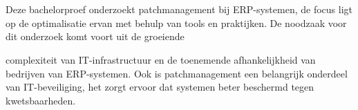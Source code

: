 
%
%
%
%
%

%



\chapter*{}


Deze bachelorproef onderzoekt patchmanagement bij ERP-systemen, de focus ligt op de optimalisatie ervan met behulp van tools en praktijken. De noodzaak voor dit onderzoek komt voort uit de groeiende 

complexiteit van IT-infrastructuur en de toenemende afhankelijkheid van bedrijven van ERP-systemen. Ook is patchmanagement een belangrijk onderdeel van IT-beveiliging, het zorgt ervoor dat systemen beter beschermd tegen kwetsbaarheden.

